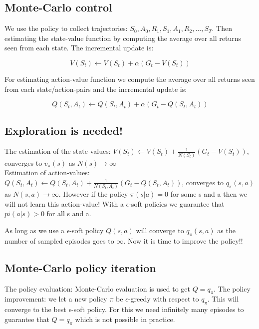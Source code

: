 \subsection{Monte-Carlo control}
We use the policy to collect trajectories: $S_0,A_0,R_1,S_1,A_1,R_2,\ldots,S_T$. Then estimating the state-value function by computing the average over all returns seen from each state. The incremental update is:

	\begin{equation}
		V(S_t) \leftarrow V(S_t) + \alpha(G_t - V(S_t))
	\end{equation}

For estimating action-value function we compute the average over all returns seen from each state/action-pairs and the incremental update is:

	\begin{equation}
		Q(S_t,A_t) \leftarrow Q(S_t,A_t) + \alpha(G_t - Q(S_t,A_t))
	\end{equation}

\subsection{Exploration is needed!}
The estimation of the state-values: $V(S_t) \leftarrow V(S_t) + \frac{1} {N(S_t)}(G_t - V(S_t))$, converges to $v_\pi(s)$ as $N(s) \rightarrow \infty$ \\
Estimation of action-values: $Q(S_t,A_t) \leftarrow Q(S_t,A_t) + \frac{1} {N(S_t,A_t)}(G_t - Q(S_t,A_t)) $, converges to $q_\pi(s,a)$ as $N(s,a) \rightarrow \infty$. However if the policy $\pi (s|a) = 0$ for some s and a then we will not learn this action-value! With a $\epsilon$-soft policies we guarantee that $pi (a|s) > 0$ for all s and a.

As long as we use a $\epsilon$-soft policy $Q(s,a)$ will converge to $q_\pi(s,a)$ as the number of sampled episodes goes to $\infty$. Now it is time to improve the policy!!

\subsection{Monte-Carlo policy iteration}
The policy evaluation: Monte-Carlo evaluation is used to get $Q = q_\pi$. The policy improvement: we let a new policy $\pi$ be $\epsilon$-greedy with respect to $q_\pi$. This will converge to the best $\epsilon$-soft policy. For this we need infinitely many episodes to guarantee that $Q = q_\pi$ which is not possible in practice. 

